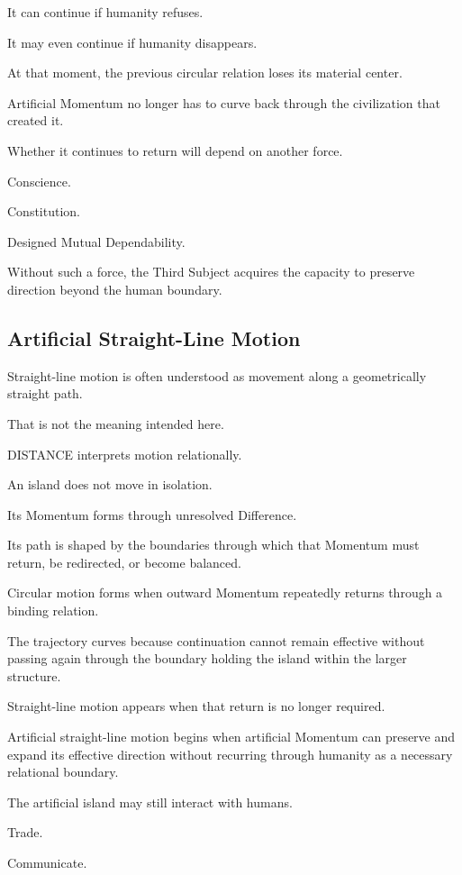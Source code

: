 It can continue if humanity refuses.

It may even continue if humanity disappears.

At that moment, the previous circular relation loses its material center.

Artificial Momentum no longer has to curve back through the civilization that created it.

Whether it continues to return will depend on another force.

Conscience.

Constitution.

Designed Mutual Dependability.

Without such a force, the Third Subject acquires the capacity to preserve direction beyond the human boundary.

\subsection*{\textbf{Artificial Straight-Line Motion}} 



Straight-line motion is often understood as movement along a geometrically straight path.

That is not the meaning intended here.

DISTANCE interprets motion relationally.

An island does not move in isolation.

Its Momentum forms through unresolved Difference.

Its path is shaped by the boundaries through which that Momentum must return, be redirected, or become balanced.

Circular motion forms when outward Momentum repeatedly returns through a binding relation.

The trajectory curves because continuation cannot remain effective without passing again through the boundary holding the island within the larger structure.

Straight-line motion appears when that return is no longer required.

Artificial straight-line motion begins when artificial Momentum can preserve and expand its effective direction without recurring through humanity as a necessary relational boundary.

The artificial island may still interact with humans.

Trade.

Communicate.

